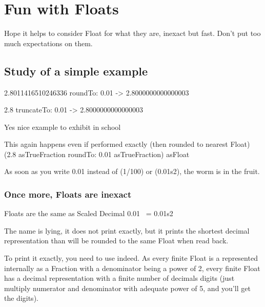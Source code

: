 \documentclass[a4paper,10pt,twoside]{book}
\begin{document}
\fi
\sloppy

\chapter{Fun with Floats}

Hope it helps to consider Float for what they are, inexact but fast.
Don't put too much expectations on them.



\section{Study of a simple example}

\begin{code}{}
2.8011416510246336 roundTo: 0.01
-> 2.8000000000000003

2.8 truncateTo: 0.01
-> 2.8000000000000003
\end{code}






Yes nice example to exhibit in school

This again happens even if performed exactly (then rounded to nearest Float)
(2.8 asTrueFraction roundTo: 0.01 asTrueFraction) asFloat

As soon as you write 0.01 instead of (1/100) or (0.01s2), the worm is
in the fruit.



\subsection{Once more, Floats are inexact}

\begin{code}{Floats are the same as Scaled Decimal}
   0.01 ~= 0.01s2
\end{code}
   
   
   
   
The name  is lying, it does not print exactly,
but it prints the shortest decimal representation than will be rounded
to the same Float when read back.

To print it exactly, you need to use  indeed.
As every finite Float is a represented internally as a Fraction with a
denominator being a power of 2, every finite Float has a decimal
representation with a finite number of decimals digits (just multiply
numerator and denominator with adequate power of 5, and you'll get the
digits).
\end{document}
